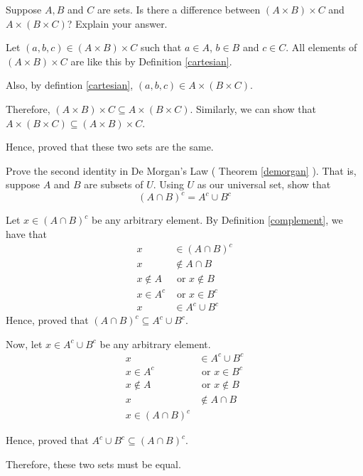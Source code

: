 \begin{problem}
	Suppose $A, B$ and $C$ are sets. Is there a difference between $(A \times B) \times C$ and $A \times (B \times C)$? Explain your answer.
\end{problem}

\begin{solution}
	Let $(a, b, c) \in (A \times B) \times C$ such that $a \in A$, $b \in B$ and $c \in C$. All elements of $(A \times B) \times C$ are like this by Definition \ref{cartesian}.

	Also, by defintion \ref{cartesian}, $(a, b, c) \in A \times (B \times C)$.

	Therefore, $(A \times B) \times C \subseteq A \times (B \times C)$.
	Similarly, we can show that $A \times (B \times C) \subseteq (A \times B) \times C$.

	Hence, proved that these two sets are the same.
\end{solution}


\begin{problem}
	Prove the second identity in De Morgan's Law ( Theorem \ref{demorgan} ).
	That is, suppose $A$ and $B$ are subsets of $U$. Using $U$ as our universal set, show that
	$$(A \cap B)^c  = A^c \cup B^c$$
\end{problem}

\begin{solution}
	Let $x \in (A \cap B)^c$ be any arbitrary element. By Definition \ref{complement}, we have that 
	\begin{align}
		x &\in (A \cap B)^c \\
		x &\not\in A \cap B \\
		x \not\in A &\text{ or } x \not\in B \\
		x \in A^c &\text{ or } x \in B^c \\
		x &\in A^c \cup B^c
	\end{align}
	Hence, proved that $(A \cap B)^c \subseteq A^c \cup B^c$.

	Now, let $x \in A^c \cup B^c$ be any arbitrary element.
	\begin{align}
		x &\in A^c \cup B^c \\
		x \in A^c &\text{ or } x \in B^c \\
		x \not\in A &\text{ or } x \not\in B \\
		x &\not\in A \cap B \\
		x \in (A \cap B)^c
	\end{align}

	Hence, proved that $A^c \cup B^c \subseteq (A \cap B)^c$.

	Therefore, these two sets must be equal.
\end{solution}


